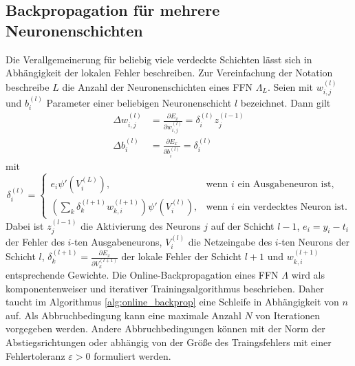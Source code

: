 \subsection*{Backpropagation für mehrere Neuronenschichten}
Die Verallgemeinerung für beliebig viele verdeckte Schichten lässt sich in Abhängigkeit der lokalen Fehler beschreiben. Zur Vereinfachung der Notation beschreibe $L$ die Anzahl der Neuronenschichten eines FFN $\Lambda_L$. Seien mit $w^{(l)}_{i,j}$ und $b^{(l)}_i$ Parameter einer beliebigen Neuronenschicht $l$ bezeichnet. Dann gilt 
\begin{align*}
    \Delta w^{(l)}_{i,j}&= \frac{\partial E_x}{\partial w^{(l)}_{i,j}}= \delta^{(l)}_i z^{(l-1)}_j \\
    \Delta b^{(l)}_{i}&= \frac{\partial E_x}{\partial b^{(l)}_{i}}= \delta^{(l)}_i
\end{align*}
mit 
\begin{equation*}
    \delta^{(l)}_i=
    \begin{cases}
        e_i \psi'(V^{(L)}_i), &\text{wenn $i$ ein Ausgabeneuron ist}, \\
        \left(\sum_{k} \delta^{(l+1)}_k w^{(l+1)}_{k,i}\right) \psi'(V_i^{(l)}), &\text{wenn $i$ ein verdecktes Neuron ist}.
    \end{cases}
\end{equation*}
Dabei ist $z^{(l-1)}_j$ die Aktivierung des Neurons $j$ auf der Schicht $l-1$, $e_i=y_i-t_i$ der Fehler des $i$-ten Ausgabeneurons, $V^{(l)}_i$ die Netzeingabe des $i$-ten Neurons der Schicht $l$, $\delta^{(l+1)}_k= \frac{\partial E_x}{\partial V^{(l+1)}_k}$ der lokale Fehler der Schicht $l+1$ und $w^{(l+1)}_{k,i}$ entsprechende Gewichte. 
Die Online-Backpropagation eines FFN $\Lambda$ wird als komponentenweiser und iterativer Trainingsalgorithmus beschrieben. Daher taucht im Algorithmus \ref{alg:online_backprop} eine Schleife in Abhängigkeit von $n$ auf. Als Abbruchbedingung kann eine maximale Anzahl $N$ von Iterationen vorgegeben werden. Andere Abbruchbedingungen können mit der Norm der Abstiegsrichtungen oder abhängig von der Größe des Traingsfehlers mit einer Fehlertoleranz $\varepsilon >0$ formuliert werden.

